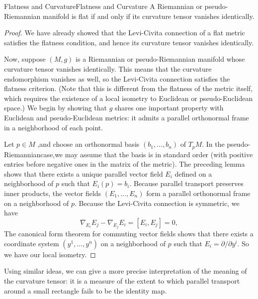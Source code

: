 \documentclass[../main.tex]{subfiles}
\begin{document}
\begin{theorem}{Flatness and Curvature}{Flatness and Curvature}
	A Riemannian or pseudo-Riemannian manifold is flat if and only if its curvature tensor vanishes identically.
\end{theorem}
\begin{proof}
	We have already showed that the Levi-Civita connection of a flat metric satisfies the flatness condition, and hence its curvature tensor vanishes identically.

	Now, suppose $(M, g)$ is a Riemannian or pseudo-Riemannian manifold whose curvature tensor vanishes identically. This means that the curvature endomorphism vanishes as well, so the Levi-Civita connection satisfies the flatness criterion. (Note that this is different from the flatness of the metric itself, which requires the existence of a local isometry to Euclidean or pseudo-Euclidean space.) We begin by showing that $g$ shares one important property with Euclidean and pseudo-Euclidean metrics: it admits a parallel orthonormal frame in a neighborhood of each point.

	Let $p \in M$ ,and choose an orthonormal basis $(b_1, \ldots, b_n)$ of $T_p M$. In the pseudo-Riemanniancase,we may assume that the basis is in standard order (with positive entries before negative ones in the matrix of the metric). The preceding lemma shows that there exists a unique parallel vector field $E_i$ defined on a neighborhood of $p$ such that $E_i(p) = b_i$. Because parallel transport preserves inner products, the vector fields $(E_1, \ldots, E_n)$ form a parallel orthonormal frame on a neighborhood of $p$. Because the Levi-Civita connection is symmetric, we have
	\begin{equation*}
		\nabla_{E_i} E_j - \nabla_{E_j} E_i = [E_i, E_j] = 0,
	\end{equation*}
	The canonical form theorem for commuting vector fields shows that there exists a coordinate system $(y^1, \ldots, y^n)$ on a neighborhood of $p$ such that $E_i = \partial / \partial y^i$. So we have our local isometry.
\end{proof}

Using similar ideas, we can give a more precise interpretation of the meaning of the curvature tensor: it is a measure of the extent to which parallel transport around a small rectangle fails to be the identity map.
\end{document}
